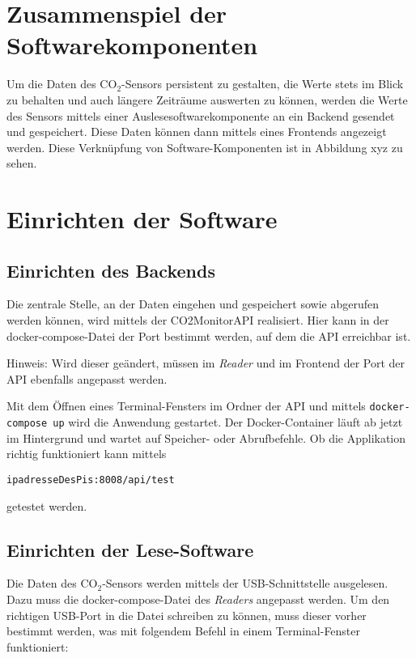 \documentclass[a4paper,
    11pt,
    headings=small,
    ngerman,
    listof=totoc,
    numbers=noenddot]{scrreprt}[2021/11/13]
\begin{document}
\section{Zusammenspiel der Softwarekomponenten}


Um die Daten des CO$_2$-Sensors persistent zu gestalten, die Werte stets im Blick zu behalten und auch längere Zeiträume auswerten zu können, werden die Werte des Sensors mittels einer Auslesesoftwarekomponente an ein Backend gesendet und gespeichert. Diese Daten können dann mittels eines Frontends angezeigt werden. Diese Verknüpfung von Software-Komponenten ist in Abbildung xyz %
zu sehen.


\section{Einrichten der Software}

\subsection{Einrichten des Backends}

Die zentrale Stelle, an der Daten eingehen und gespeichert sowie abgerufen werden können, wird mittels der CO2MonitorAPI realisiert. Hier kann in der docker-compose-Datei der Port bestimmt werden, auf dem die \ac{API} erreichbar ist.

Hinweis: Wird dieser geändert, müssen im \textit{Reader} und im Frontend der Port der \ac{API} ebenfalls angepasst werden.

Mit dem Öffnen eines Terminal-Fensters im Ordner der \ac{API} und mittels \texttt{docker-compose up} wird die Anwendung gestartet. Der Docker-Container läuft ab jetzt im Hintergrund und wartet auf Speicher- oder Abrufbefehle. Ob die Applikation richtig funktioniert kann mittels

\texttt{ipadresseDesPis:8008/api/test}

getestet werden.


\subsection{Einrichten der Lese-Software}

Die Daten des CO$_2$-Sensors werden mittels der USB-Schnittstelle ausgelesen. Dazu muss die docker-compose-Datei des \textit{Readers} angepasst werden. Um den richtigen USB-Port in die Datei schreiben zu können, muss dieser vorher bestimmt werden, was mit folgendem Befehl in einem Terminal-Fenster funktioniert:
\end{document}
